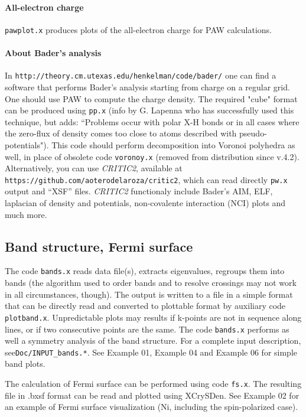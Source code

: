 \documentclass[12pt,a4paper]{article}
\begin{document}
\paragraph{All-electron charge}
\texttt{pawplot.x} produces plots of the all-electron charge
for PAW calculations.

\paragraph{About Bader's analysis}
In \texttt{http://theory.cm.utexas.edu/henkelman/code/bader/} 
one can find a software that performs Bader's analysis starting 
from charge on a regular grid. One should use PAW to compute the
charge density. The required "cube" format can be produced using 
\texttt{pp.x} (info by G. Lapenna who has successfully used this 
technique, but adds: ``Problems occur with polar X-H bonds or in
all cases where the zero-flux of density comes too close to atoms 
described with pseudo-potentials"). This code should perform 
decomposition into Voronoi polyhedra as well, in place of obsolete
code  \texttt{voronoy.x} (removed from distribution since v.4.2).
Alternatively, you can use \textsl{CRITIC2}, available at
\texttt{https://github.com/aoterodelaroza/critic2}, which can
read directly \texttt{pw.x} output and ``XSF'' files. \textsl{CRITIC2}
functionaly include Bader's AIM, ELF, laplacian of density and
potentials, non-covalente interaction (NCI) plots and much more.

\subsection{Band structure, Fermi surface}

The code \texttt{bands.x} reads data file(s), extracts eigenvalues,
regroups them into bands (the algorithm used to order bands and to resolve
crossings may not work in all circumstances, though). The output is written
to a file in a simple format that can be directly read and converted to
plottable format by auxiliary code
\texttt{plotband.x}. Unpredictable plots may results if k-points are not 
in sequence along lines, or if two consecutive points are the same. 
The code \texttt{bands.x} performs as well a 
symmetry analysis of the band structure. For a complete input description,
see\texttt{Doc/INPUT\_bands.*}. See Example 01, Example 04 and Example 06 
for simple band plots.

The calculation of Fermi surface can be performed using code \texttt{fs.x}.
The resulting file in .bxsf format can be read and plotted
using XCrySDen. See Example 02 for an example of Fermi surface 
visualization (Ni, including the spin-polarized case).
\end{document}
